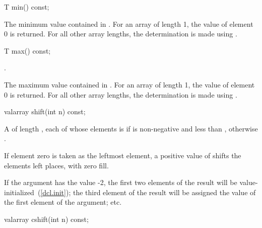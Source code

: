 %
\begin{itemdecl}
T min() const;
\end{itemdecl}

\begin{itemdescr}
\pnum
\requires
{}

\pnum
\returns
The minimum value contained in .
For an array of length 1, the value of element 0 is returned.
For all other array
lengths, the determination is made using
.
\end{itemdescr}

%
\begin{itemdecl}
T max() const;
\end{itemdecl}

\begin{itemdescr}
\pnum
\requires
{}.

\pnum
\returns
The maximum value contained in .
For an array of length 1, the value of element 0 is returned.
For all other array
lengths, the determination is made using
.
\end{itemdescr}

%
\begin{itemdecl}
valarray shift(int n) const;
\end{itemdecl}

\begin{itemdescr}
\pnum
\returns
A  of length , each of whose elements
 is
if 
is non-negative and less than
, otherwise .
\begin{note}
If element zero is taken as the leftmost element,
a positive value of  shifts the elements left 
places, with zero fill.
\end{note}

\pnum
\begin{example}
If the argument has the value -2,
the first two elements of the result will be value-initialized~(\ref{dcl.init}); the third element of the result will be assigned the value
of the first element of the argument; etc.
\end{example}
\end{itemdescr}

%
\begin{itemdecl}
valarray cshift(int n) const;
\end{itemdecl}

